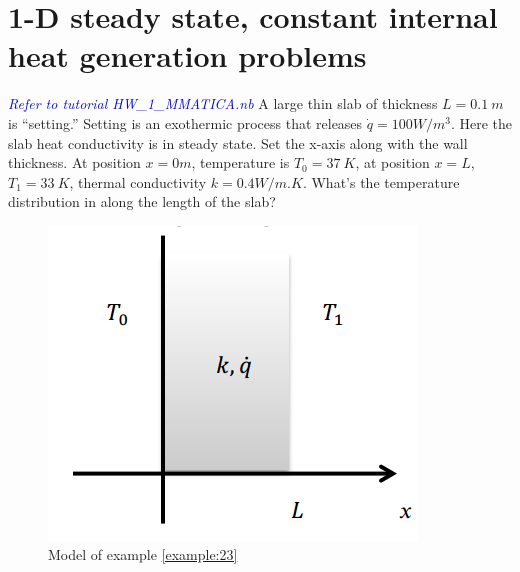 \section{1-D steady state, constant	internal heat generation problems}
\begin{example}
\label{example:23}
\textcolor{blue} {\emph{Refer to tutorial HW\_1\_MMATICA.nb}}
A large thin slab of thickness $L=0.1~m$ is “setting.” Setting is an exothermic process 
that releases $\dot{q}=100W/m^3$. Here the slab heat conductivity is in steady state. 
Set the x-axis along with the wall thickness. At position $x=0m$, temperature is $T_0=37~K$,
at position $x=L$,$T_1=33~K$, thermal conductivity $k=0.4W/m.K$. What’s the
temperature distribution in along the length of the slab? 
\begin{figure}[h!]
  \centering
    \includegraphics[scale=0.6]{figures/ch2/6}
    \caption{Model of example \ref{example:23}}
    \label{fig:2:6}
\end{figure}
\end{example}

